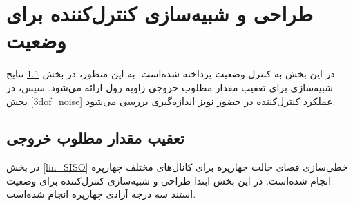\section{طراحی و شبیه‌سازی کنترل‌کننده برای وضعیت}\label{roll_pitch_yaw_lqidg_section_ll}
در این بخش به کنترل وضعیت پرداخته شده‌است. به این منظور، در بخش
\ref{3dof_regulator}
نتایج شبیه‌سازی برای تعقیب مقدار مطلوب خروجی زاویه رول ارائه می‌شود. سپس، در بخش
\ref{3dof_noise}
عملکرد کنترل‌کننده در  حضور نویز اندازه‌گیری بررسی می‌شود.
\subsection{تعقیب مقدار مطلوب خروجی}\label{3dof_regulator}


در بخش
\ref{lin_SISO}
خطی‌سازی فضای حالت چهارپره برای کانال‌های مختلف چهارپره انجام شده‌است. در این بخش ابتدا طراحی و شبیه‌سازی کنترل‌کننده برای وضعیت استند سه درجه آزادی چهارپره انجام شده‌است.


